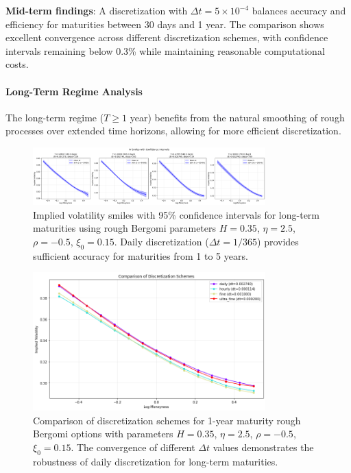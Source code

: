 	\textbf{Mid-term findings}: A discretization with $\Delta t = 5\times 10^{-4}$ balances accuracy and efficiency for maturities between 30 days and 1 year. The comparison shows excellent convergence across different discretization schemes, with confidence intervals remaining below 0.3\% while maintaining reasonable computational costs.
	
	\paragraph{Long-Term Regime Analysis}
	
	The long-term regime ($T \geq 1$ year) benefits from the natural smoothing of rough processes over extended time horizons, allowing for more efficient discretization.
	
	\begin{figure}[ht]
		\centering
		\includegraphics[width=0.8\textwidth]{../images/long_regime_discretization_confidence.png}
		\caption{Implied volatility smiles with 95\% confidence intervals for long-term maturities using rough Bergomi parameters $H = 0.35$, $\eta = 2.5$, $\rho = -0.5$, $\xi_0 = 0.15$. Daily discretization ($\Delta t = 1/365$) provides sufficient accuracy for maturities from 1 to 5 years.}
		\label{fig:discretization-long}
	\end{figure}
	
	\begin{figure}[ht]
		\centering
		\includegraphics[width=0.8\textwidth]{../images/long_regime_discretization_schemes.png}
		\caption{Comparison of discretization schemes for 1-year maturity rough Bergomi options with parameters $H = 0.35$, $\eta = 2.5$, $\rho = -0.5$, $\xi_0 = 0.15$. The convergence of different $\Delta t$ values demonstrates the robustness of daily discretization for long-term maturities.}
		\label{fig:discretization-schemes-long}
	\end{figure}
	
